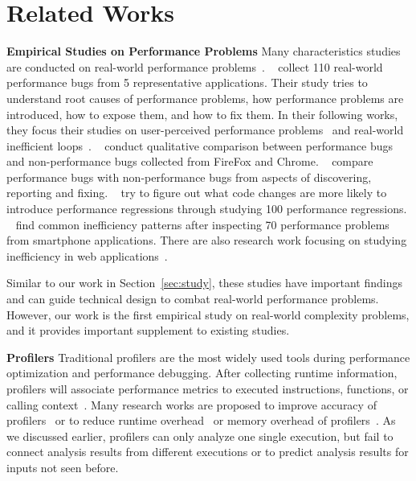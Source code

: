 \newpage

\section{Related Works}
\label{sec:related}

\noindent\textbf{Empirical Studies on Performance Problems}
Many characteristics studies are conducted on real-world performance 
problems~\cite{PerfBug,SongOOPSLA2014,ldoctor,Zaman2012MSR,Nistor2013MSR,HuangRegression,SmartphoneStudy,junwen-1, junwen-2}. 
~\citet{PerfBug} collect 110 real-world performance bugs from 5 representative applications.
Their study tries to understand root causes of performance problems,
how performance problems are introduced, how to expose them, and how to fix them.
In their following works, they focus their studies on 
user-perceived performance problems~\cite{SongOOPSLA2014} 
and real-world inefficient loops~\cite{ldoctor}. 
~\citet{Zaman2012MSR} conduct qualitative comparison between performance bugs 
and non-performance bugs collected from FireFox and Chrome. 
~\citet{Nistor2013MSR} compare performance bugs with non-performance bugs 
from aspects of discovering, reporting and fixing. 
~\citet{HuangRegression} try to figure out what code changes are more likely to introduce performance regressions through 
studying 100 performance regressions. 
~\citet{SmartphoneStudy} find common inefficiency patterns after 
inspecting 70 performance problems from smartphone applications. 
There are also research work focusing on studying inefficiency in web applications~\cite{junwen-1, junwen-2}. 

Similar to our work in Section~\ref{sec:study}, 
these studies have important findings and can guide technical design to combat 
real-world performance problems. 
However, our work is the first empirical study on real-world complexity problems, 
and it provides important supplement to existing studies. 

\noindent\textbf{Profilers}
Traditional profilers are the most widely used tools 
during performance optimization and performance debugging. 
After collecting runtime information, 
profilers will associate performance metrics to executed instructions, 
functions, or calling context~\cite{oprofile,gprof, CCT}.
Many research works are proposed to improve 
accuracy of profilers~\cite{4Profilers, LagHunter, AppInsight} or 
to reduce runtime overhead~\cite{AdaptiveBurst} 
or memory overhead of profilers~\cite{HotCallingContext}. 
As we discussed earlier, profilers can only analyze one single execution, 
but fail to connect analysis results from different executions 
or to predict analysis results for inputs not seen before.  

